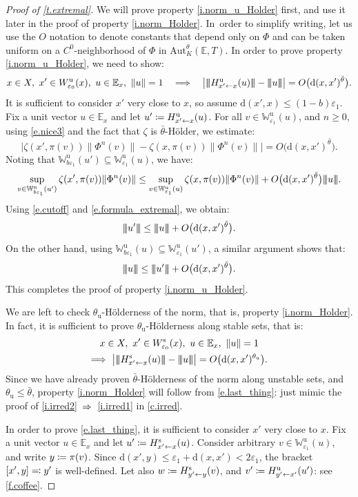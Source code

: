 \documentclass[JEP,XML,SOM,Unicode]{cedram}
\def\vcentcolon{\mathrel{\mathop\ordinarycolon}}
\providecommand\ordinarycolon{:}
\providecommand*\coloneqq{\vcentcolon\mathrel{\mkern-1.2mu}=}
\providecommand*\eqqcolon{=\mathrel{\mkern-1.2mu}\vcentcolon}
\let\eqcolon\eqqcolon
\newcommand\implique{\mathchoice{\Longrightarrow}{\Rightarrow}{\Rightarrow}{\Rightarrow}}
\theoremstyle{plain}
\theoremstyle{definition}
\newcommand{\tribar}[1]{\mathopen{| {\kern -1.5pt} | {\kern -1.5pt} |} {#1}
\mathclose{| {\kern -1.5pt} | {\kern -1.5pt} |}}
\newcommand{\EE}{\mathbb{E}}
\newcommand{\WW}{\mathbb{W}}
\newcommand{\dd}{\mathrm{d}}
\newcommand{\uu}{\mathrm{u}}
\renewcommand{\ss}{\mathrm{s}}
\newcommand{\Aut}{\mathrm{Aut}}
\let\epsilon\varepsilon
\begin{document}
\begin{proof}[Proof of \cref{t.extremal}]
We will prove property \eqref{i.norm_u_Holder} first, and use it later in the proof of property \eqref{i.norm_Holder}.
In~order to simplify writing, let us use the $O$ notation to denote constants that depend only on $\Phi$ and can be taken uniform on a $C^0$-neighborhood of $\Phi$ in $\Aut^\theta_K(\EE,T)$.
In order to prove property \eqref{i.norm_u_Holder}, we need to show:
\[
x \in X, \ x' \in W^\uu_{\epsilon_0}(x), \ u \in \EE_x, \ \|u\| = 1 \quad \implique \quad
\big| \tribar{H^\uu_{x' \gets x}(u)} - \tribar{u} \big| = O \big( \dd(x,x')^{\bar \theta} \big).
\]
It is sufficient to consider $x'$ very close to $x$, so assume $\dd(x',x)\le (1-b)\epsilon_1$.
Fix a unit vector $u \in \EE_x$ and let $u' \coloneqq H^\uu_{x' \gets x}(u)$.
For all $v \in \WW^\uu_{\epsilon_1}(u)$, and $n\ge 0$, using \eqref{e.nice3} and the fact that
$\zeta$ is $\bar\theta$-Hölder, we estimate:
\[
\Big| \zeta(x', \pi(v)) \|\Phi^n(v)\| - \zeta(x,\pi(v)) \|\Phi^n(v)\| \Big| = O \big( \dd(x,x')^{\bar \theta} \big).
\]
Noting that $\WW^\uu_{b\epsilon_1}(u') \subseteq \WW^\uu_{\epsilon_1}(u)$, we have:
\[
\sup_{v \in \WW^\uu_{b\epsilon_1}(u')} \zeta(x', \pi(v)) \|\Phi^n(v)\| \le
\sup_{v \in \WW^\uu_{ \epsilon_1}(u )} \zeta(x, \pi(v)) \|\Phi^n(v)\| + O \big( \dd(x,x')^{\bar\theta} \big) \tribar{u}.
\]
Using \eqref{e.cutoff} and \eqref{e.formula_extremal}, we obtain:
\[
\tribar{u'} \le \tribar{u} + O \big( \dd(x,x')^{\bar \theta} \big).
\]
On the other hand, using $\WW^\uu_{b\epsilon_1}(u) \subseteq \WW^\uu_{\epsilon_1}(u')$, a similar argument shows that:
\[
\tribar{u} \le \tribar{u'} + O \big( \dd(x,x')^{\bar \theta} \big).
\]
This completes the proof of property \eqref{i.norm_u_Holder}.

We are left to check $\theta_\uu$-Hölderness of the norm, that is, property \eqref{i.norm_Holder}.
In fact, it is sufficient to prove $\theta_\uu$-Hölderness along stable sets, that is:
\begin{multline}\label{e.last_thing}
x \in X, \ x' \in W^\ss_{\epsilon_0}(x), \ u \in \EE_x, \ \|u\|=1 \\ \implique \
\big| \tribar{H^\ss_{x' \gets x}(u) } - \tribar{u} \big| = O \big( \dd(x,x')^{\theta_\uu} \big).
\end{multline}
Since we have already proven $\bar\theta$-Hölderness of the norm along unstable sets, and $\theta_\uu \le \bar\theta$,
property \eqref{i.norm_Holder} will follow from \eqref{e.last_thing}: just mimic the proof of \eqref{i.irred2}~$\implique$~\eqref{i.irred1} in \cref{c.irred}.

In order to prove \eqref{e.last_thing}, it is sufficient to consider $x'$ very close to $x$.
Fix a unit vector $u \in \EE_x$ and let $u' \coloneqq H^\ss_{x' \gets x}(u)$.
Consider arbitrary $v \in \WW^\uu_{\epsilon_1}(u)$, and write $y \coloneqq \pi(v)$.
Since $\dd(x',y) \le \epsilon_1 + \dd(x,x') < 2\epsilon_1$, the bracket $[x',y] \eqcolon y'$ is well-defined.
Let also $w \coloneqq H^\ss_{y' \gets y}(v)$, and $v' \coloneqq H^\uu_{y' \gets x'}(u')$: see \cref{f.coffee}.


\end{proof}
\end{document}
